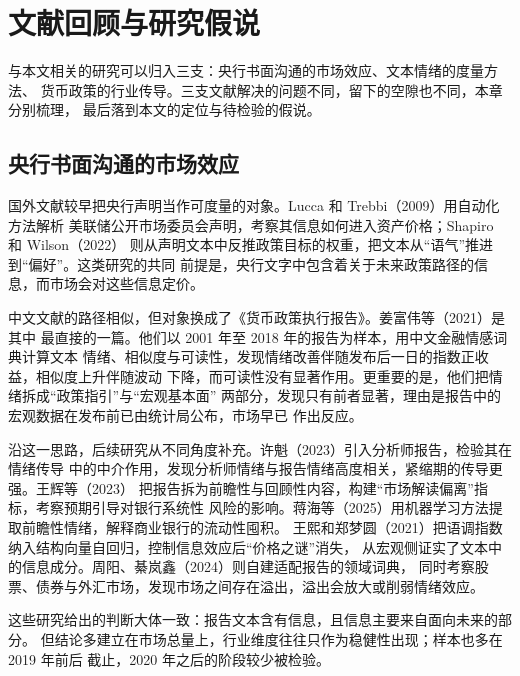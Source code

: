 
\section{文献回顾与研究假说}

与本文相关的研究可以归入三支：央行书面沟通的市场效应、文本情绪的度量方法、
货币政策的行业传导。三支文献解决的问题不同，留下的空隙也不同，本章分别梳理，
最后落到本文的定位与待检验的假说。

\subsection{央行书面沟通的市场效应}

国外文献较早把央行声明当作可度量的对象。Lucca 和 Trebbi（2009）用自动化方法解析
美联储公开市场委员会声明，考察其信息如何进入资产价格；Shapiro 和 Wilson（2022）
则从声明文本中反推政策目标的权重，把文本从“语气”推进到“偏好”。这类研究的共同
前提是，央行文字中包含着关于未来政策路径的信息，而市场会对这些信息定价。

中文文献的路径相似，但对象换成了《货币政策执行报告》。姜富伟等（2021）是其中
最直接的一篇。他们以 2001 年至 2018 年的报告为样本，用中文金融情感词典计算文本
情绪、相似度与可读性，发现情绪改善伴随发布后一日的指数正收益，相似度上升伴随波动
下降，而可读性没有显著作用。更重要的是，他们把情绪拆成“政策指引”与“宏观基本面”
两部分，发现只有前者显著，理由是报告中的宏观数据在发布前已由统计局公布，市场早已
作出反应。

沿这一思路，后续研究从不同角度补充。许魁（2023）引入分析师报告，检验其在情绪传导
中的中介作用，发现分析师情绪与报告情绪高度相关，紧缩期的传导更强。王辉等（2023）
把报告拆为前瞻性与回顾性内容，构建“市场解读偏离”指标，考察预期引导对银行系统性
风险的影响。蒋海等（2025）用机器学习方法提取前瞻性情绪，解释商业银行的流动性囤积。
王熙和郑梦圆（2021）把语调指数纳入结构向量自回归，控制信息效应后“价格之谜”消失，
从宏观侧证实了文本中的信息成分。周阳、綦岚鑫（2024）则自建适配报告的领域词典，
同时考察股票、债券与外汇市场，发现市场之间存在溢出，溢出会放大或削弱情绪效应。

这些研究给出的判断大体一致：报告文本含有信息，且信息主要来自面向未来的部分。
但结论多建立在市场总量上，行业维度往往只作为稳健性出现；样本也多在 2019 年前后
截止，2020 年之后的阶段较少被检验。


